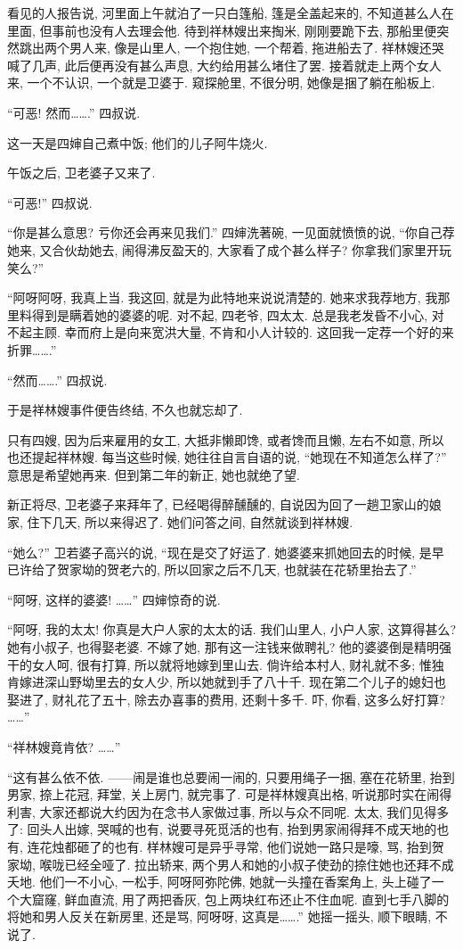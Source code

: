 看见的人报告说, 河里面上午就泊了一只白篷船,
篷是全盖起来的, 不知道甚么人在里面, 但事前也没有人去理会他.
待到祥林嫂出来掏米, 刚刚要跪下去,
那船里便突然跳出两个男人来, 像是山里人,
一个抱住她, 一个帮着, 拖进船去了.
祥林嫂还哭喊了几声, 此后便再没有甚么声息, 大约给用甚么堵住了罢.
接着就走上两个女人来, 一个不认识, 一个就是卫婆于.
窥探舱里, 不很分明, 她像是捆了躺在船板上.

``可恶!
然而…….''
四叔说.

这一天是四婶自己煮中饭;
他们的儿子阿牛烧火.

午饭之后, 卫老婆子又来了.

``可恶!'' 四叔说.

``你是甚么意思? 亏你还会再来见我们.''
四婶洗著碗, 一见面就愤愤的说,
``你自己荐她来, 又合伙劫她去,
闹得沸反盈天的, 大家看了成个甚么样子?
你拿我们家里开玩笑么?''

``阿呀阿呀, 我真上当.
我这回, 就是为此特地来说说清楚的.
她来求我荐地方, 我那里料得到是瞒着她的婆婆的呢.
对不起, 四老爷, 四太太.
总是我老发昏不小心, 对不起主顾.
幸而府上是向来宽洪大量, 不肯和小人计较的.
这回我一定荐一个好的来折罪…….''

``然而…….'' 四叔说.

于是祥林嫂事件便告终结, 不久也就忘却了.

只有四嫂, 因为后来雇用的女工,
大抵非懒即馋, 或者馋而且懒, 左右不如意,
所以也还提起祥林嫂.
每当这些时候, 她往往自言自语的说,
``她现在不知道怎么样了?''
意思是希望她再来.
但到第二年的新正, 她也就绝了望.

新正将尽, 卫老婆子来拜年了, 已经喝得醉醺醺的,
自说因为回了一趟卫家山的娘家, 住下几天, 所以来得迟了.
她们问答之间, 自然就谈到祥林嫂.

``她么?''
卫若婆子高兴的说,
``现在是交了好运了.
她婆婆来抓她回去的时候,
是早已许给了贺家坳的贺老六的,
所以回家之后不几天,
也就装在花轿里抬去了.''

``阿呀, 这样的婆婆! ……''
四婶惊奇的说.

``阿呀, 我的太太!
你真是大户人家的太太的话.
我们山里人, 小户人家, 这算得甚么?
她有小叔子, 也得娶老婆.
不嫁了她, 那有这一注钱来做聘礼?
他的婆婆倒是精明强干的女人呵, 很有打算, 所以就将地嫁到里山去.
倘许给本村人, 财礼就不多;
惟独肯嫁进深山野坳里去的女人少, 所以她就到手了八十千.
现在第二个儿子的媳妇也娶进了, 财礼花了五十,
除去办喜事的费用, 还剩十多千.
吓, 你看, 这多么好打算? ……''

``祥林嫂竟肯依? ……''

``这有甚么依不依.
——闹是谁也总要闹一闹的, 只要用绳子一捆, 塞在花轿里,
抬到男家, 捺上花冠, 拜堂, 关上房门, 就完事了.
可是祥林嫂真出格, 听说那时实在闹得利害,
大家还都说大约因为在念书人家做过事, 所以与众不同呢.
太太, 我们见得多了:
回头人出嫁, 哭喊的也有, 说要寻死觅活的也有,
抬到男家闹得拜不成天地的也有, 连花烛都砸了的也有.
样林嫂可是异乎寻常,
他们说她一路只是嚎, 骂, 抬到贺家坳, 喉咙已经全哑了.
拉出轿来, 两个男人和她的小叔子使劲的捺住她也还拜不成夭地.
他们一不小心, 一松手, 阿呀阿弥陀佛,
她就一头撞在香案角上, 头上碰了一个大窟窿,
鲜血直流, 用了两把香灰, 包上两块红布还止不住血呢.
直到七手八脚的将她和男人反关在新房里, 还是骂,
阿呀呀, 这真是…….''
她摇一摇头, 顺下眼睛, 不说了.

